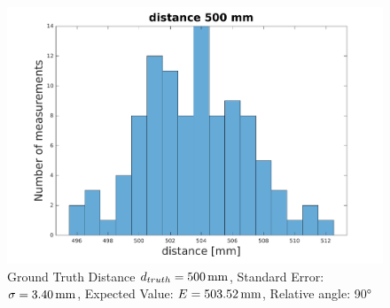 \begin{figure}
	\centering
	\includegraphics[width=0.9\linewidth]{pictures/plot_dist500.pdf}
	\caption{Ground Truth Distance $d_{truth}= \unit[500]{mm}$, Standard Error: $\sigma=\unit[3.40]{mm}$, Expected Value: $E=\unit[503.52]{mm}$, Relative angle: 90°}
	\label{fig:dist500}
\end{figure}

